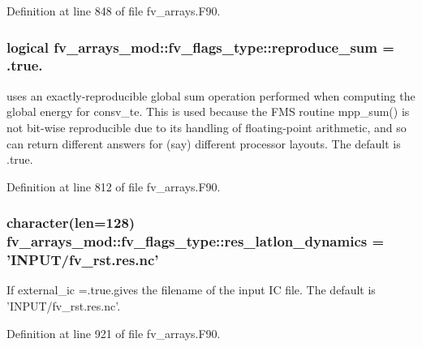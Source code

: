 Definition at line 848 of file fv\-\_\-arrays.\-F90.

\subsubsection[{reproduce\-\_\-sum}]{\setlength{\rightskip}{0pt plus 5cm}logical fv\-\_\-arrays\-\_\-mod\-::fv\-\_\-flags\-\_\-type\-::reproduce\-\_\-sum = .true.}\label{structfv__arrays__mod_1_1fv__flags__type_a43ba9fca6402ea52dcdbe845b1589517}


uses an exactly-\/reproducible global sum operation performed when computing the global energy for consv\-\_\-te. This is used because the F\-M\-S routine mpp\-\_\-sum() is not bit-\/wise reproducible due to its handling of floating-\/point arithmetic, and so can return different answers for (say) different processor layouts. The default is .true. 



Definition at line 812 of file fv\-\_\-arrays.\-F90.

\subsubsection[{res\-\_\-latlon\-\_\-dynamics}]{\setlength{\rightskip}{0pt plus 5cm}character(len=128) fv\-\_\-arrays\-\_\-mod\-::fv\-\_\-flags\-\_\-type\-::res\-\_\-latlon\-\_\-dynamics = 'I\-N\-P\-U\-T/fv\-\_\-rst.\-res.\-nc'}\label{structfv__arrays__mod_1_1fv__flags__type_a46c8b4d374ce3fafe4c962d714e23fea}


If external\-\_\-ic =.true.\-gives the filename of the input I\-C file. The default is 'I\-N\-P\-U\-T/fv\-\_\-rst.\-res.\-nc'. 



Definition at line 921 of file fv\-\_\-arrays.\-F90.

